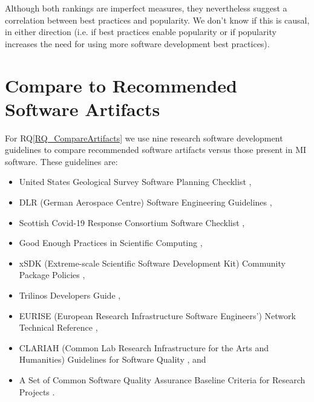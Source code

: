 \documentclass[final, 12pt, 3p, times]{elsarticle}
\newcommand{\rqref}[1]{RQ\ref{#1}}
\begin{document}
Although both rankings are imperfect measures, they nevertheless suggest a
correlation between best practices and popularity. We don't know if this is
causal, in either direction (i.e. if best practices enable popularity or if
popularity increases the need for using more software development best
practices).

\section{Compare to Recommended Software Artifacts} \label{Sec_CompareArtifacts}

For \rqref{RQ_CompareArtifacts} we use nine research software development
guidelines to compare recommended software artifacts versus those present in MI
software.  These guidelines are:
\begin{itemize}
\item United States Geological Survey Software Planning Checklist
\cite{USGS2019},
\item DLR (German Aerospace Centre) Software Engineering Guidelines
\cite{TobiasEtAl2018}, 
\item Scottish Covid-19 Response Consortium Software Checklist
\cite{BrettEtAl2021},
\item Good Enough Practices in Scientific Computing \cite{WilsonEtAl2016},
\item xSDK (Extreme-scale Scientific Software Development Kit) Community Package
Policies \cite{SmithAndRoscoe2018},
\item Trilinos Developers Guide \cite{HerouxEtAl2008},
\item EURISE (European Research Infrastructure Software Engineers') Network
Technical Reference \cite{ThielEtAl2020},
\item CLARIAH (Common Lab Research Infrastructure for the Arts and Humanities)
Guidelines for Software Quality \cite{vanGompelEtAl2016}, and
\item A Set of Common Software Quality Assurance Baseline Criteria for Research
Projects \cite{OrvizEtAl2017}.
\end{itemize}
\end{document}

